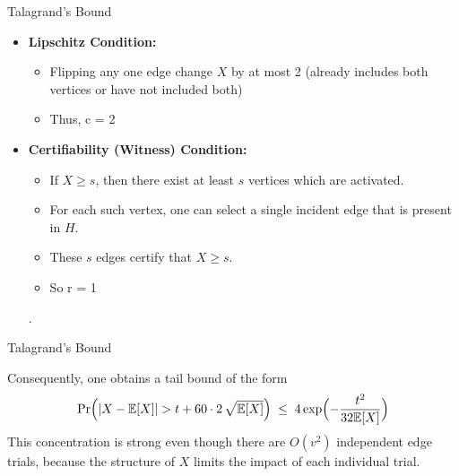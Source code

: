 \documentclass[aspectratio=169, handout]{beamer}
\begin{document}
\begin{frame}{Talagrand's Bound}
  \begin{itemize}
    \item \textbf{Lipschitz Condition:}
      \begin{itemize}
        \item Flipping any one edge change  \(X\) by at most 2 (already includes both vertices or have not included both)
        \item Thus, c = 2 
      \end{itemize}
    \item \textbf{Certifiability (Witness) Condition:}
      \begin{itemize}
        \item If \(X \ge s\), then there exist at least \(s\) vertices which are activated.
        \item For each such vertex, one can select a single incident edge that is present in \(H\).
        \item These \(s\) edges certify that \(X \ge s\).
        \item So r = 1 
      \end{itemize}.
  \end{itemize}
  
\end{frame}

\begin{frame}{Talagrand's Bound}

  Consequently, one obtains a tail bound of the form
  \[
    \Pr\Bigl(\lvert X - \mathbb{E}[X] \rvert > t + 60 \cdot 2\,\sqrt{\mathbb{E}[X]}\Bigr)
    \;\le\; 4\exp\Bigl(-\frac{ t^2}{32\mathbb{E}[X] }\Bigr)
  \]
  \noindent This concentration is strong even though there are \(O(v^2)\) independent edge trials, because the structure of \(X\) limits the impact of each individual trial.
\end{frame}
\end{document}

